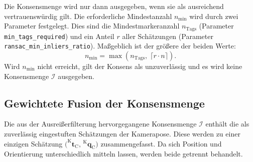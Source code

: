 Die Konsensmenge wird nur dann ausgegeben, wenn sie als ausreichend vertrauenswürdig gilt.
Die erforderliche Mindestanzahl $n_{\min}$ wird durch zwei Parameter festgelegt. 
Dies sind die Mindestmarkeranzahl $n_{\mathrm{Tags}}$ (Parameter \texttt{min\_tags\_required}) und ein Anteil $r$ aller 
Schätzungen (Parameter \texttt{ransac\_min\_inliers\_ratio}).
Maßgeblich ist der größere der beiden Werte:
\begin{equation}
n_{\min} = \max\!\left(n_{\mathrm{Tags}},\; \lceil r \cdot n \rceil\right).
\label{eq:pos_ransac_konsens}
\end{equation}
Wird $n_{\min}$ nicht erreicht, gilt der Konsens als unzuverlässig und es wird keine Konsensmenge $\mathcal{I}$ ausgegeben.



\subsection*{Gewichtete Fusion der Konsensmenge}
\label{subsec:pos_fusion}
Die aus der Ausreißerfilterung hervorgegangene Konsensmenge $\mathcal{I}$ enthält die als zuverlässig eingestuften Schätzungen der Kamerapose.
Diese werden zu einer einzigen Schätzung $\bigl(^{\mathrm{K}}\mathbf{t}_{\mathrm{C}},\,{^{\mathrm{K}}\mathbf{q}_{\mathrm{C}}}\bigr)$ zusammengefasst.
Da sich Position und Orientierung unterschiedlich mitteln lassen, werden beide getrennt behandelt.

